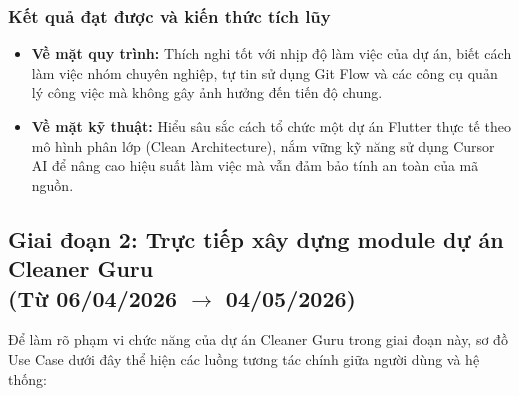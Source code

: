 \documentclass[12pt, a4paper]{article}
\begin{document}
\subsubsection{Kết quả đạt được và kiến thức tích lũy}
\begin{itemize}
    \item \textbf{Về mặt quy trình:} Thích nghi tốt với nhịp độ làm việc của dự án, biết cách làm việc nhóm chuyên nghiệp, tự tin sử dụng Git Flow và các công cụ quản lý công việc mà không gây ảnh hưởng đến tiến độ chung.
    \item \textbf{Về mặt kỹ thuật:} Hiểu sâu sắc cách tổ chức một dự án Flutter thực tế theo mô hình phân lớp (Clean Architecture), nắm vững kỹ năng sử dụng Cursor AI để nâng cao hiệu suất làm việc mà vẫn đảm bảo tính an toàn của mã nguồn.
\end{itemize}

\subsection[Giai đoạn 2: Trực tiếp xây dựng module dự án Cleaner Guru (Từ 06/04/2026 đến 04/05/2026)]{Giai đoạn 2: Trực tiếp xây dựng module dự án Cleaner Guru \\(Từ 06/04/2026 $\rightarrow$ 04/05/2026)}
Để làm rõ phạm vi chức năng của dự án Cleaner Guru trong giai đoạn này, sơ đồ Use Case dưới đây thể hiện các luồng tương tác chính giữa người dùng và hệ thống:

\cleanerUseCaseFigure
\end{document}
